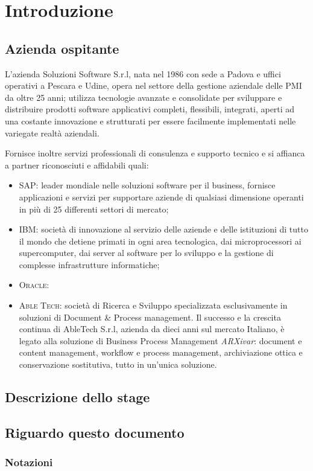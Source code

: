 \chapter{Introduzione}\label{ch:introduzione}

\section{Azienda ospitante}
L'azienda Soluzioni Software S.r.l, nata nel 1986 con sede a Padova e uffici operativi a Pescara e Udine, opera nel settore della gestione aziendale delle \acs{PMI} da oltre 25 anni; utilizza tecnologie avanzate e consolidate per sviluppare e distribuire prodotti software applicativi completi, flessibili, integrati, aperti ad una costante innovazione e strutturati per essere facilmente implementati nelle variegate realtà aziendali.

Fornisce inoltre servizi professionali di consulenza e supporto tecnico e si affianca a partner riconosciuti e affidabili quali:
\begin{itemize}
	\item \textsc{SAP:} leader mondiale nelle soluzioni software per il business, fornisce applicazioni e servizi per supportare aziende di qualsiasi dimensione operanti in più di 25 differenti settori di mercato;
	\item \textsc{IBM:} società di innovazione al servizio delle aziende e delle istituzioni di tutto il mondo che detiene primati in ogni area tecnologica, dai microprocessori ai supercomputer, dai server al software per lo sviluppo e la gestione di complesse infrastrutture informatiche;
	\item \textsc{Oracle:} 
	\item \textsc{Able Tech:} società di Ricerca e Sviluppo specializzata esclusivamente in soluzioni di Document & Process management. Il successo e la crescita continua di AbleTech S.r.l, azienda da dieci anni sul mercato Italiano, è legato alla soluzione di Business Process Management \emph{ARXivar}: document e content management, workflow e process management, archiviazione ottica e conservazione sostitutiva, tutto in un'unica soluzione.
\end{itemize}




\section{Descrizione dello stage}

\section{Riguardo questo documento}
\subsection{Notazioni}
